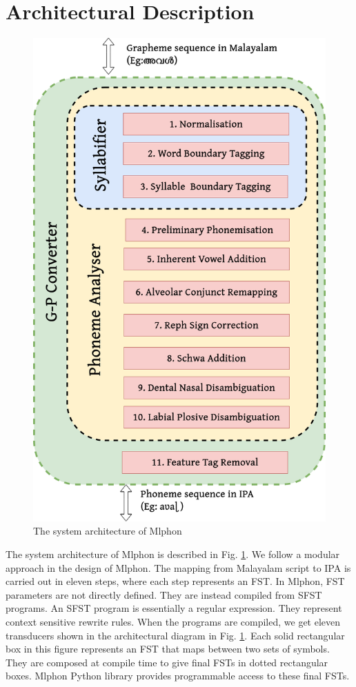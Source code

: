 \section{Architectural Description}

\begin{figure}[!ht]
	\centering
	\includegraphics[width=0.6\linewidth]{g2p.png}
	\caption{The system architecture of Mlphon}
	\label{architecture}
\end{figure}

The system architecture of Mlphon is described in Fig. \ref{architecture}. We
follow a modular approach in the design of Mlphon. The mapping from Malayalam
script to IPA is carried out in eleven steps, where each step represents an
FST. In Mlphon, FST parameters are not directly defined. They are instead
compiled from SFST programs. An SFST program is essentially a regular
expression. They represent context sensitive rewrite rules. When the programs
are compiled, we get eleven transducers shown in the architectural diagram in
Fig. \ref{architecture}. Each solid rectangular box in this figure represents an FST that maps between two sets of symbols. They are composed at compile time to give final FSTs in dotted rectangular boxes. Mlphon Python library provides programmable access to these final FSTs.

